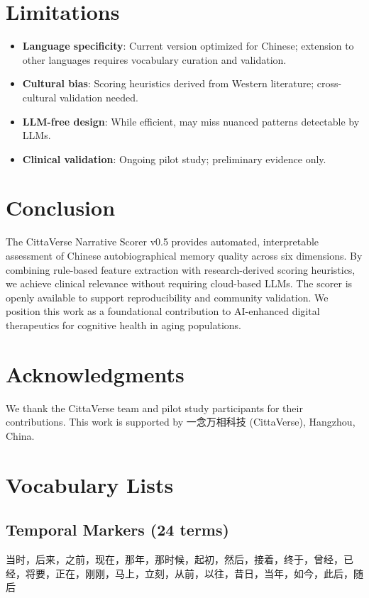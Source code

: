 \documentclass[11pt]{article}
\begin{document}
\section{Limitations}

\begin{itemize}
  \item \textbf{Language specificity}: Current version optimized for Chinese; extension to other languages requires vocabulary curation and validation.
  \item \textbf{Cultural bias}: Scoring heuristics derived from Western literature; cross-cultural validation needed.
  \item \textbf{LLM-free design}: While efficient, may miss nuanced patterns detectable by LLMs.
  \item \textbf{Clinical validation}: Ongoing pilot study; preliminary evidence only.
\end{itemize}

\section{Conclusion}

The CittaVerse Narrative Scorer v0.5 provides automated, interpretable assessment of Chinese autobiographical memory quality across six dimensions. By combining rule-based feature extraction with research-derived scoring heuristics, we achieve clinical relevance without requiring cloud-based LLMs. The scorer is openly available to support reproducibility and community validation. We position this work as a foundational contribution to AI-enhanced digital therapeutics for cognitive health in aging populations.

\section*{Acknowledgments}

We thank the CittaVerse team and pilot study participants for their contributions. This work is supported by 一念万相科技 (CittaVerse), Hangzhou, China.




\appendix
\section{Vocabulary Lists}

\subsection{Temporal Markers (24 terms)}
当时，后来，之前，现在，那年，那时候，起初，然后，接着，终于，曾经，已经，将要，正在，刚刚，马上，立刻，从前，以往，昔日，当年，如今，此后，随后
\end{document}
